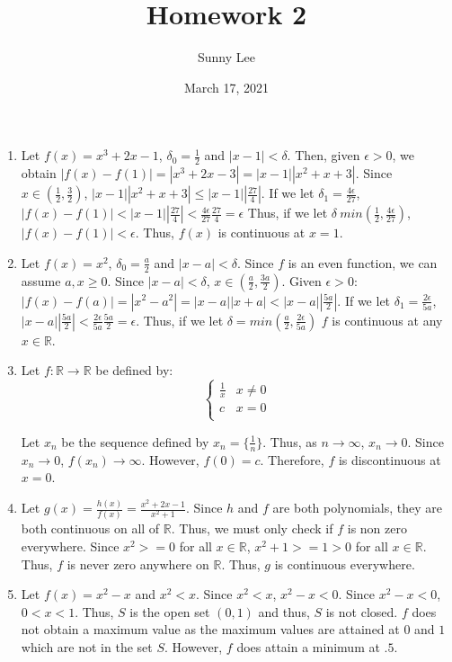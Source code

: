 \documentclass{article}
\title{Homework 2}
\author{Sunny Lee}
\date{March 17, 2021}
\newcommand{\rr}{\mathbb R}
\begin{document}
\begin{enumerate}
    \item Let $f(x) = x^3+2x-1$, $\delta_0 = \frac{1}{2}$
    and $|x-1| < \delta$. Then, 
    given $\epsilon > 0$, we obtain $|f(x) - f(1)| = |x^3+2x-3| = |x-1||x^2+x+3|$. 
    Since $x\in (\frac{1}{2}, \frac{3}{2})$, $|x-1||x^2+x+3| \leq |x-1||\frac{27}{4}|$. 
    If we let $\delta_1 = \frac{4\epsilon}{27}$, $|f(x) - f(1)| < |x-1||\frac{27}{4}|
    < \frac{4\epsilon}{27} \frac{27}{4} = \epsilon$
    Thus, if we let $\delta \ min(\frac{1}{2}, \frac{4\epsilon}{27})$, 
    $|f(x) - f(1)| < \epsilon$. Thus, $f(x)$ is continuous at $x = 1$.
    
    \item Let $f(x) = x^2$, $\delta_0 = \frac{a}{2}$ and $|x-a| < \delta$. Since $f$ 
    is an even function, we can assume $a, x \geq 0$. Since $|x-a| < \delta$, 
    $x\in (\frac{a}{2}, \frac{3a}{2})$. Given $\epsilon > 0$: $|f(x) - f(a)| = 
    |x^2 - a^2| = |x - a||x + a| < |x - a||\frac{5a}{2}|$. If we let $\delta_1 = 
    \frac{2\epsilon}{5a}$, $|x - a||\frac{5a}{2}| < \frac{2\epsilon}{5a} \frac{5a}{2}
     = \epsilon$. Thus, if we let $\delta = min(\frac{a}{2}, \frac{2\epsilon}{5a})$
    $f$ is continuous at any $x\in \rr$. 

    \item Let $f:\rr \rightarrow \rr$ be defined by: 
    \[
    \begin{cases}
        \frac{1}{x} & x\neq 0 \\
        c & x = 0 \\
    \end{cases}
    \]

    Let $x_n$ be the sequence defined by $x_n = \{\frac{1}{n}\}$. Thus, as 
    $n\rightarrow \infty$, $x_n\rightarrow 0$. Since $x_n\rightarrow 0$, 
    $f(x_n)\rightarrow \infty$. However, $f(0) = c$. Therefore, $f$ is discontinuous 
    at $x = 0$. 

    \item Let $g(x) = \frac{h(x)}{f(x)} = \frac{x^2+2x-1}{x^2+1}$. Since $h$ and $f$ 
    are both polynomials, they are both continuous on all of $\rr$. Thus, we must only 
    check if $f$ is non zero everywhere. Since $x^2 >= 0$ for all $x\in \rr$, 
    $x^2 + 1 >= 1 > 0$ for all $x\in \rr$. Thus, $f$ is never zero anywhere on $\rr$. 
    Thus, $g$ is continuous everywhere.

    \item Let $f(x) = x^2 - x$ and $x^2 < x$. Since $x^2 < x$, $x^2 - x < 0$. Since 
    $x^2 - x < 0$, $0 < x < 1$. Thus, $S$ is the open set $(0, 1)$ and thus, $S$ is not 
    closed. $f$ does not obtain a maximum value as the maximum values are attained at 
    $0$ and $1$ which are not in the set $S$. However, $f$ does attain a minimum 
    at $.5$. 


\end{enumerate}
\end{document}
